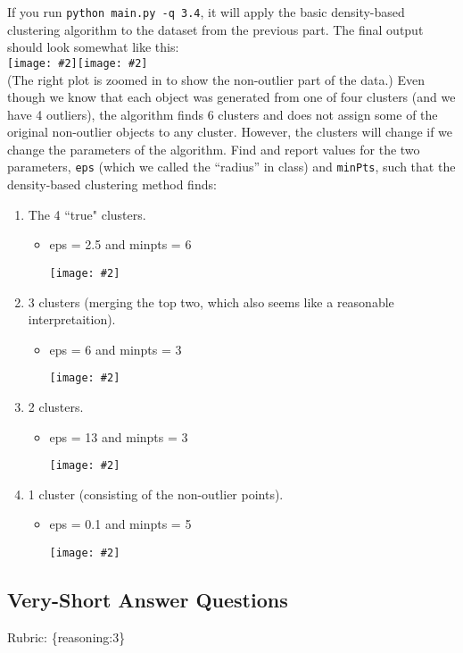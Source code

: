 \documentclass{article}
\def\gre#1{{\color{gre}#1}}
\newcommand{\fig}[2]{\texttt{[image: \#2]}}
\newcommand{\centerfig}[2]{\begin{center}\texttt{[image: \#2]}\end{center}}
\def\items#1{\begin{itemize}#1\end{itemize}}
\def\enum#1{\begin{enumerate}#1\end{enumerate}}
\def\rubric#1{\gre{Rubric: \{#1\}}}{}
\begin{document}
{{{If you run \texttt{python main.py -q 3.4},
it will apply the basic density-based clustering algorithm to the dataset from the previous part.
The final output should look somewhat like this:\\
\fig{.49}{../figs/density}\fig{.49}{../figs/density2}\\
(The right plot is zoomed in to show the non-outlier part of the data.)
Even though we know that each object was generated from one of four clusters (and we have 4 outliers),
 the algorithm finds 6 clusters and does not assign some of the original non-outlier
  objects to any cluster. However, the clusters will change if we change the parameters
  of the algorithm. Find and report values for the two
  parameters, \texttt{eps} (which we called the ``radius'' in class) and \texttt{minPts},
   such that the density-based clustering method finds:
{\enum{
\item The 4 ``true" clusters.
\items{
\item eps = 2.5  and minpts = 6 \centerfig{.5}{../figs/clusterdata_dbscan_4clusters.png}
}
\item 3 clusters (merging the top two, which also seems like a reasonable interpretaition).
\items{
\item eps = 6  and minpts = 3 \centerfig{.5}{../figs/clusterdata_dbscan_3clusters.png}
}
\item 2 clusters.
\items{
\item eps = 13  and minpts = 3 \centerfig{.5}{../figs/clusterdata_dbscan_2clusters.png}
}
\item 1 cluster (consisting of the non-outlier points).
\items{
\item eps = 0.1  and minpts = 5 \centerfig{.5}{../figs/clusterdata_dbscan_1cluster.png}
}
}


\subsection{Very-Short Answer Questions}
\rubric{reasoning:3}

}}}}
\end{document}
